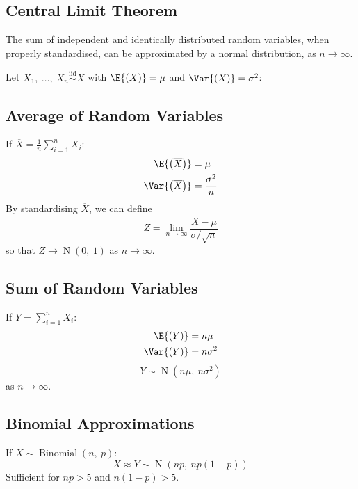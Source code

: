 \documentclass{article}
\begin{document}
\hfill%
\begin{minipage}{126.1962963mm}
    \begin{multicols}{2}
        \section{Central Limit Theorem}
        The sum of independent and identically distributed random
        variables, when properly standardised, can be approximated by a
        normal distribution, as \(n \to \infty\).

        Let \(X_1,\: \ldots,\: X_n \overset{\mathrm{iid}}{\sim} X\)
        with \(\E{\left( X \right)} = \mu\) and \(\Var{\left( X
        \right)} = \sigma^2\):
        \subsection{Average of Random Variables}
        If \(\overline{X} = \frac{1}{n} \sum_{i = 1}^n X_i\):
        \begin{align*}
            \E{\left( \overline{X} \right)}   & = \mu                \\
            \Var{\left( \overline{X} \right)} & = \frac{\sigma^2}{n}
        \end{align*}
        By standardising \(\overline{X}\), we can define
        \begin{equation*}
            Z = \lim_{n \to \infty} \frac{\overline{X} - \mu}{\sigma / \sqrt{n}}
        \end{equation*}
        so that \(Z \to \operatorname{N}{\left( 0,\: 1 \right)}\) as \(n \to \infty\).
        \subsection{Sum of Random Variables}
        If \(Y = \sum_{i = 1}^n X_i\):
        \begin{align*}
            \E{\left( Y \right)}   & = n \mu      \\
            \Var{\left( Y \right)} & = n \sigma^2
        \end{align*}
        \begin{equation*}
            Y \sim \operatorname{N}{\left( n \mu,\: n \sigma^2 \right)}
        \end{equation*}
        as \(n \to \infty\).
        \subsection{Binomial Approximations}
        If \(X \sim \operatorname{Binomial}{\left( n,\: p \right)}\):
        \begin{equation*}
            X \approx Y \sim \operatorname{N}{\left( np,\: np\left( 1 - p \right) \right)}
        \end{equation*}
        Sufficient for \(np > 5\) and \(n\left( 1 - p \right) > 5\).


\end{multicols}
\end{minipage}
\end{document}
